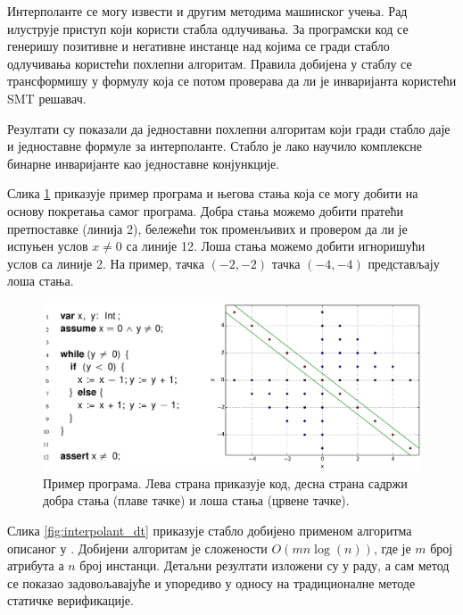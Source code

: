 \documentclass[a4paper]{article}
\begin{document}
{Интерполанте се могу извести и другим методима машинског учења. Рад \cite{KrishnaPW15} илуструје приступ који
користи стабла одлучивања. За програмски код се генеришу позитивне и негативне инстанце над којима се гради
стабло одлучивања користећи похлепни алгоритам. Правила добијена у стаблу се трансформишу у формулу која
се потом проверава да ли је инваријанта користећи \textsc{SMT} решавач.

Резултати су показали да једноставни похлепни алгоритам који гради стабло даје и једноставне формуле
за интерполанте. Стабло је лако научило комплексне бинарне инваријанте као једноставне конјункције.

Слика \ref{fig:interpolant_example2} приказује пример програма и његова стања која се могу добити на основу
покретања самог програма. Добра стања можемо добити пратећи претпоставке (линија 2), бележећи ток променљивих
и провером да ли је испуњен услов $x \neq 0$ са линије 12. Лоша стања можемо добити игноришући услов са линије 2.
На пример, тачка $(-2, -2)$ тачка $(-4, -4)$ представљају лоша стања.

\begin{figure}[h!]
\begin{center}
\includegraphics[scale=0.18]{./slike/interpolant2.png}
\end{center}
    \caption{Пример програма. Лева страна приказује код, десна страна садржи добра стања (плаве тачке) и лоша
    стања (црвене тачке).}
\label{fig:interpolant_example2}
\end{figure}

Слика \ref{fig:interpolant_dt} приказује стабло добијено применом алгоритма описаног у \cite{KrishnaPW15}.
Добијени алгоритам је сложености $O(mn \log(n))$, где је $m$ број атрибута а $n$ број инстанци.
Детаљни резултати изложени су у раду, а сам метод се показао задовољавајуће и упоредиво у односу
на традиционалне методе статичке верификације.

}
\end{document}
